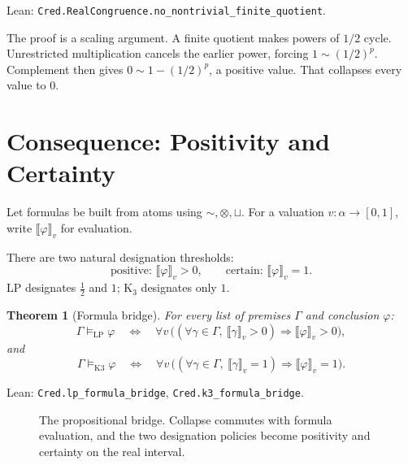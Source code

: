\documentclass[11pt,a4paper]{article}
\newtheorem{theorem}{Theorem}[section]
\newcommand{\collapse}{\kappa}
\newcommand{\negc}{\mathord{\sim}}
\newcommand{\conjc}{\otimes}
\newcommand{\disjc}{\sqcup}
\newcommand{\half}{\tfrac12}
\newcommand{\val}[1]{\llbracket #1 \rrbracket}
\newcommand{\Lean}[1]{\texttt{#1}}
\begin{document}
\noindent
Lean: \Lean{Cred.RealCongruence.no\_nontrivial\_finite\_quotient}.

The proof is a scaling argument.  A finite quotient makes powers of
$1/2$ cycle.  Unrestricted multiplication cancels the earlier power,
forcing $1\sim(1/2)^p$.  Complement then gives
$0\sim 1-(1/2)^p$, a positive value.  That collapses every value to
$0$.

\section{Consequence: Positivity and Certainty}

Let formulas be built from atoms using $\negc,\conjc,\disjc$.
For a valuation $v:\alpha\to[0,1]$, write $\val{\varphi}_v$ for
evaluation.

There are two natural designation thresholds:
\[
  \text{positive: }\val{\varphi}_v>0,\qquad
  \text{certain: }\val{\varphi}_v=1.
\]
LP designates $\half$ and $1$; K$_3$ designates only $1$.

\begin{theorem}[Formula bridge]
\label{thm:formula-bridge}
For every list of premises $\Gamma$ and conclusion $\varphi$:
\[
\Gamma\models_{\mathrm{LP}}\varphi
\quad\Longleftrightarrow\quad
\forall v\,
\bigl((\forall\gamma\in\Gamma,\ \val{\gamma}_v>0)
\Rightarrow \val{\varphi}_v>0\bigr),
\]
and
\[
\Gamma\models_{\mathrm{K3}}\varphi
\quad\Longleftrightarrow\quad
\forall v\,
\bigl((\forall\gamma\in\Gamma,\ \val{\gamma}_v=1)
\Rightarrow \val{\varphi}_v=1\bigr).
\]
\end{theorem}

\noindent
Lean: \Lean{Cred.lp\_formula\_bridge},
\Lean{Cred.k3\_formula\_bridge}.

\begin{figure}[h]
\centering
{}
\caption{The propositional bridge.  Collapse commutes with formula
evaluation, and the two designation policies become positivity and
certainty on the real interval.}
\label{fig:bridge}
\end{figure}
\end{document}
